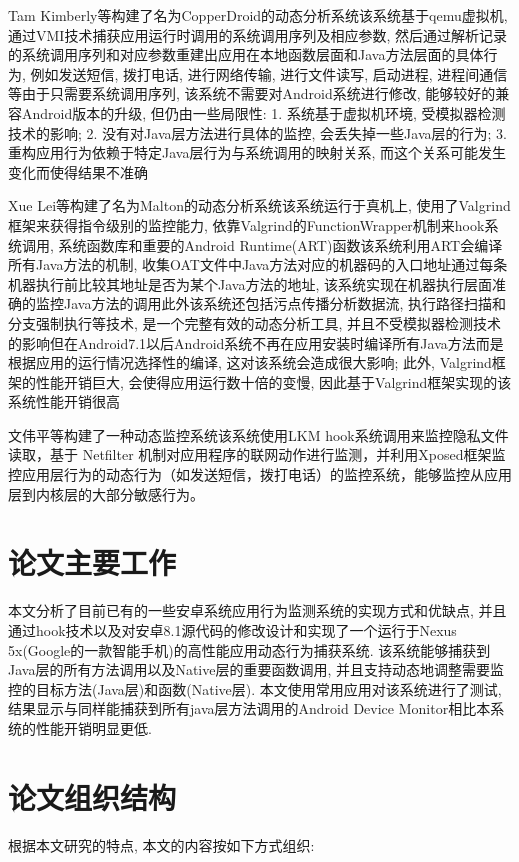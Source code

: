 Tam Kimberly等构建了名为CopperDroid的动态分析系统\juhao 该系统基于qemu虚拟机, 通过VMI技术捕获应用运行时调用的系统调用序列及相应参数, 然后通过解析记录的系统调用序列和对应参数重建出应用在本地函数层面和Java方法层面的具体行为, 例如发送短信, 拨打电话, 进行网络传输, 进行文件读写, 启动进程, 进程间通信等\juhao 由于只需要系统调用序列, 该系统不需要对Android系统进行修改, 能够较好的兼容Android版本的升级, 但仍由一些局限性:
1. 系统基于虚拟机环境, 受模拟器检测技术的影响;
2. 没有对Java层方法进行具体的监控, 会丢失掉一些Java层的行为;
3. 重构应用行为依赖于特定Java层行为与系统调用的映射关系, 而这个关系可能发生变化而使得结果不准确\juhao

Xue Lei等构建了名为Malton的动态分析系统\juhao 该系统运行于真机上, 使用了Valgrind框架来获得指令级别的监控能力, 依靠Valgrind的FunctionWrapper机制来hook系统调用, 系统函数库和重要的Android Runtime(ART)函数\juhao 该系统利用ART会编译所有Java方法的机制, 收集OAT文件中Java方法对应的机器码的入口地址\juhao 通过每条机器执行前比较其地址是否为某个Java方法的地址, 该系统实现在机器执行层面准确的监控Java方法的调用\juhao 此外该系统还包括污点传播分析数据流, 执行路径扫描和分支强制执行等技术, 是一个完整有效的动态分析工具, 并且不受模拟器检测技术的影响\juhao 但在Android7.1以后Android系统不再在应用安装时编译所有Java方法而是根据应用的运行情况选择性的编译, 这对该系统会造成很大影响; 此外, Valgrind框架的性能开销巨大, 会使得应用运行数十倍的变慢, 因此基于Valgrind框架实现的该系统性能开销很高\juhao

文伟平等构建了一种动态监控系统\juhao 该系统使用LKM hook系统调用来监控隐私文件读取，基于 Netfilter 机制对应用程序的联网动作进行监测，并利用Xposed框架监控应用层行为的动态行为（如发送短信，拨打电话）的监控系统，能够监控从应用层到内核层的大部分敏感行为。



\section{论文主要工作}
本文分析了目前已有的一些安卓系统应用行为监测系统的实现方式和优缺点, 并且通过hook技术以及对安卓8.1源代码的修改设计和实现了一个运行于Nexus 5x(Google的一款智能手机)的高性能应用动态行为捕获系统. 该系统能够捕获到Java层的所有方法调用以及Native层的重要函数调用, 并且支持动态地调整需要监控的目标方法(Java层)和函数(Native层). 本文使用常用应用对该系统进行了测试, 结果显示与同样能捕获到所有java层方法调用的Android Device Monitor相比本系统的性能开销明显更低.

\section{论文组织结构}
根据本文研究的特点, 本文的内容按如下方式组织:

